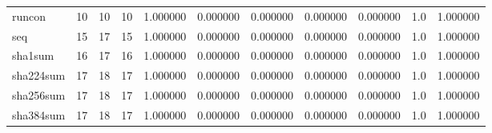 \begin{longtable}{lrrrrrrrrrr}
runcon    &                                      10 &                 10 &                                10 &                                   1.000000 &                               0.000000 &                                     0.000000 &                          0.000000 &                                0.000000 &                                1.0 &                                           1.000000 \\
seq       &                                      15 &                 17 &                                15 &                                   1.000000 &                               0.000000 &                                     0.000000 &                          0.000000 &                                0.000000 &                                1.0 &                                           1.000000 \\
sha1sum   &                                      16 &                 17 &                                16 &                                   1.000000 &                               0.000000 &                                     0.000000 &                          0.000000 &                                0.000000 &                                1.0 &                                           1.000000 \\
sha224sum &                                      17 &                 18 &                                17 &                                   1.000000 &                               0.000000 &                                     0.000000 &                          0.000000 &                                0.000000 &                                1.0 &                                           1.000000 \\
sha256sum &                                      17 &                 18 &                                17 &                                   1.000000 &                               0.000000 &                                     0.000000 &                          0.000000 &                                0.000000 &                                1.0 &                                           1.000000 \\
sha384sum &                                      17 &                 18 &                                17 &                                   1.000000 &                               0.000000 &                                     0.000000 &                          0.000000 &                                0.000000 &                                1.0 &                                           1.000000 \\

\end{longtable}
